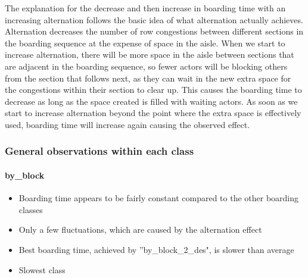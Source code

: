 \documentclass[11pt]{article}
\begin{document}
 The explanation for the decrease and then increase in boarding time with an increasing alternation follows the basic idea of what alternation actually achieves. Alternation decreases the number of row congestions between different sections in the boarding sequence at the expense of space in the aisle. When we start to increase alternation, there will be more space in the aisle between sections that are adjacent in the boarding sequence, so fewer actors will be blocking others from the section that follows next, as they can wait in the new extra space for the congestions within their section to clear up. 
 This causes the boarding time to decrease as long as the space created is filled with waiting actors. As soon as we start to increase alternation beyond the point where the extra space is effectively used, boarding time will increase again causing the observed effect.
 
  \subsubsection{General observations within each class}
 \paragraph{by\_block} \begin{itemize}
 	\item Boarding time appears to be fairly constant compared to the other boarding classes
 	\item Only a few fluctuations, which are caused by the alternation effect
 	\item Best boarding time, achieved by ''by\_block\_2\_des", is slower than average
 	\item Slowest class
 \end{itemize}
\end{document}
